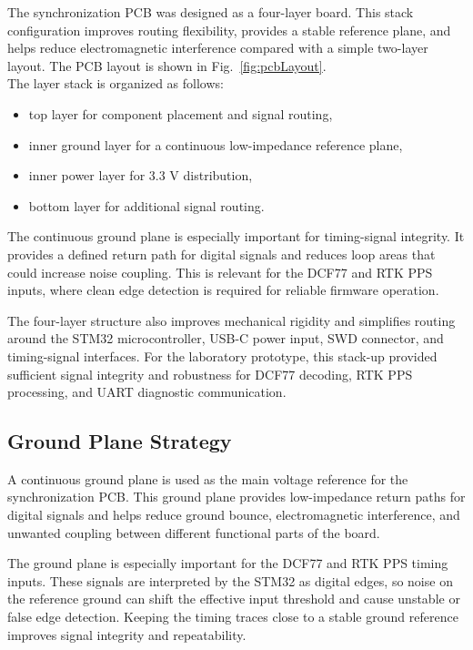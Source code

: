 The synchronization PCB was designed as a four-layer board. This stack configuration improves routing flexibility, provides a stable reference plane, and helps reduce electromagnetic interference compared with a simple two-layer layout. The PCB layout is shown in Fig.~\ref{fig:pcbLayout}.
\\
The layer stack is organized as follows:
\begin{itemize}
    \item top layer for component placement and signal routing,
    \item inner ground layer for a continuous low-impedance reference plane,
    \item inner power layer for 3.3 V distribution,
    \item bottom layer for additional signal routing.
\end{itemize}

The continuous ground plane is especially important for timing-signal integrity. It provides a defined return path for digital signals and reduces loop areas that could increase noise coupling. This is relevant for the DCF77 and RTK PPS inputs, where clean edge detection is required for reliable firmware operation.

The four-layer structure also improves mechanical rigidity and simplifies routing around the STM32 microcontroller, USB-C power input, SWD connector, and timing-signal interfaces. For the laboratory prototype, this stack-up provided sufficient signal integrity and robustness for DCF77 decoding, RTK PPS processing, and UART diagnostic communication.

\subsection{Ground Plane Strategy}

A continuous ground plane is used as the main voltage reference for the synchronization PCB. This ground plane provides low-impedance return paths for digital signals and helps reduce ground bounce, electromagnetic interference, and unwanted coupling between different functional parts of the board.

The ground plane is especially important for the DCF77 and RTK PPS timing inputs. These signals are interpreted by the STM32 as digital edges, so noise on the reference ground can shift the effective input threshold and cause unstable or false edge detection. Keeping the timing traces close to a stable ground reference improves signal integrity and repeatability.

